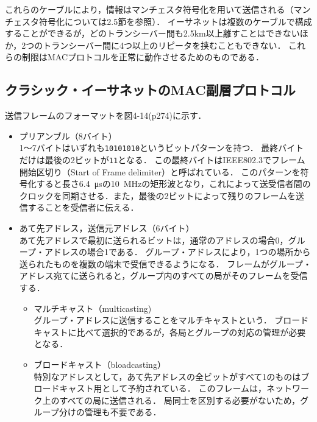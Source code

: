 \documentclass[a4paper]{ltjsarticle}
\providecommand{\tightlist}{%
  \setlength{\itemsep}{0pt}\setlength{\parskip}{0pt}}
\begin{document}
これらのケーブルにより，情報はマンチェスタ符号化を用いて送信される（マンチェスタ符号化については2.5節を参照）．
イーサネットは複数のケーブルで構成することができるが，どのトランシーバー間も2.5km以上離すことはできないほか，2つのトランシーバー間に4つ以上のリピータを挟むこともできない．
これらの制限はMACプロトコルを正常に動作させるためのものである．

\subsection{クラシック・イーサネットのMAC副層プロトコル}\label{ux30afux30e9ux30b7ux30c3ux30afux30a4ux30fcux30b5ux30cdux30c3ux30c8ux306emacux526fux5c64ux30d7ux30edux30c8ux30b3ux30eb}

送信フレームのフォーマットを図4-14(p274)に示す．

\begin{itemize}
\tightlist
\item
  プリアンブル（8バイト）\\
  1〜7バイトはいずれも\texttt{10101010}というビットパターンを持つ．
  最終バイトだけは最後の2ビットが\texttt{11}となる．
  この最終バイトはIEEE802.3でフレーム開始区切り（Start of Frame
  delimiter）と呼ばれている．
  このパターンを符号化すると長さ\SI{6.4}{\micro s}の\SI{10}{MHz}の矩形波となり，これによって送受信者間のクロックを同期させる．また，最後の2ビットによって残りのフレームを送信することを受信者に伝える．
\item
  あて先アドレス，送信元アドレス（6バイト）\\
  あて先アドレスで最初に送られるビットは，通常のアドレスの場合0，グループ・アドレスの場合1である．
  グループ・アドレスにより，1つの場所から送られたものを複数の端末で受信できるようになる．
  フレームがグループ・アドレス宛てに送られると，グループ内のすべての局がそのフレームを受信する．

  \begin{itemize}
  \tightlist
  \item
    マルチキャスト（multicasting)\\
    グループ・アドレスに送信することをマルチキャストという．
    ブロードキャストに比べて選択的であるが，各局とグループの対応の管理が必要となる．
  \item
    ブロードキャスト（bloadcasting）\\
    特別なアドレスとして，あて先アドレスの全ビットがすべて1のものはブロードキャスト用として予約されている．
    このフレームは，ネットワーク上のすべての局に送信される．
    局同士を区別する必要がないため，グループ分けの管理も不要である．
  \end{itemize}


\end{itemize}
\end{document}
